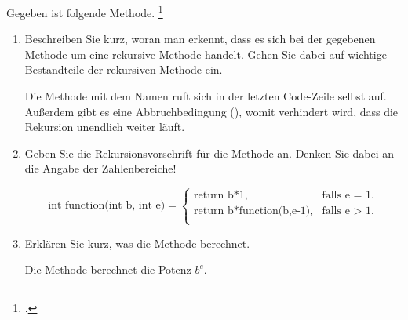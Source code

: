 \documentclass{bschlangaul-aufgabe}
\begin{document}

Gegeben ist folgende Methode.
\footcite[Aufgabenblatt 1: Abstrakte Klassen, Interface, Rekursion, Seite 2, Aufgabe 2]{aud:ab:1}

\begin{enumerate}


\item Beschreiben Sie kurz, woran man erkennt, dass es sich bei der
gegebenen Methode um eine rekursive Methode handelt. Gehen Sie dabei auf
wichtige Bestandteile der rekursiven Methode ein.

\begin{bAntwort}
Die Methode mit dem Namen  ruft sich in der letzten
Code-Zeile selbst auf. Außerdem gibt es eine Abbruchbedingung
(), womit verhindert wird,
dass die Rekursion unendlich weiter läuft.
\end{bAntwort}


\item Geben Sie die Rekursionsvorschrift für die Methode
 an. Denken Sie dabei an die Angabe der
Zahlenbereiche!

\begin{bAntwort}
\begin{equation*}
\text{int function(int b, int e)} =
\begin{cases}
\text{return b*1}, &
\text{falls e = 1}.\\

\text{return b*function(b,e-1)}, &
\text{falls e > 1}.\\
\end{cases}
\end{equation*}
\end{bAntwort}


\item Erklären Sie kurz, was die Methode 
berechnet.

\begin{bAntwort}
Die Methode  berechnet die Potenz $b^e$.
\end{bAntwort}
\end{enumerate}
\end{document}

